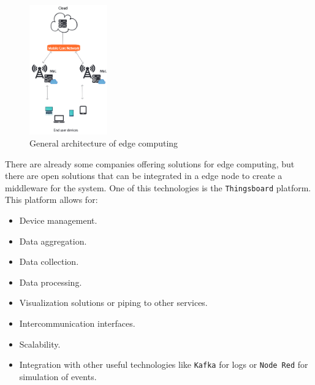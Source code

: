 \begin{figure}[H]
    \centering
    \includegraphics[width=0.3\textwidth]{./images/4/MEC.png}
    \caption{General architecture of edge computing\cite{MobileEdgeComputing}}
    \label{fig:mec}
\end{figure}

There are already some companies offering  solutions for edge computing, but there are open solutions that can be integrated in a edge node to create a middleware for the system. One of this 
technologies is the \texttt{Thingsboard} platform. This platform\cite{ThingsBoardOpensourceIoT} allows for:
\begin{itemize}
    \item Device management.
    \item Data aggregation.
    \item Data collection.
    \item Data processing.
    \item Visualization solutions or piping to other services.
    \item Intercommunication interfaces.
    \item Scalability.
    \item Integration with other useful technologies like \texttt{Kafka} for logs or \texttt{Node Red} for simulation of events.
\end{itemize}
